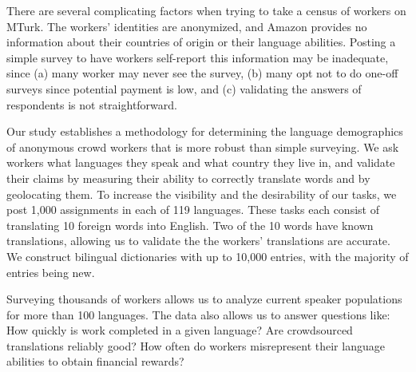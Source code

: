 \documentclass[11pt]{article}
\begin{document}

There are several complicating factors when trying to take a census of workers on MTurk.  The workers' identities are anonymized, and Amazon provides no information about their countries of origin or their language abilities.  Posting a simple survey to have workers self-report this information may be inadequate, since (a) many worker may never see the survey, (b) many opt not to do one-off surveys since potential payment is low, and (c) validating the answers of respondents is not straightforward. 

Our study establishes a methodology for determining the language demographics of anonymous crowd workers that is more robust than simple surveying. We ask workers what languages they speak and what country they live in, and validate their claims by measuring their ability to correctly translate words and by geolocating them.  To increase the visibility and the desirability of our tasks, we post 1,000 assignments in each of 119 languages.  These tasks each consist of translating 10 foreign words into English.  Two of the 10 words have known translations, allowing us to validate the the workers' translations are accurate.  We construct bilingual dictionaries with up to 10,000 entries, with the majority of entries being new. 

Surveying thousands of workers allows us to analyze current speaker populations for more than 100 languages.  The data also allows us to answer questions like: 
How quickly is work completed in a given language? 
Are crowdsourced translations reliably good? 
How often do workers misrepresent their language abilities to obtain financial rewards? 
\end{document}
